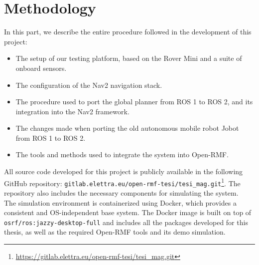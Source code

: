 \chapter{Methodology}
In this part, we describe the entire procedure followed in the development of this project:
\begin{itemize}
	\item The setup of our testing platform, based on the Rover Mini and a suite of onboard sensors.
	\item The configuration of the Nav2 navigation stack.
	\item The procedure used to port the global planner from ROS 1 to ROS 2, and its integration into the Nav2 framework.
	\item The changes made when porting the old autonomous mobile robot Jobot from ROS 1 to ROS 2.
	\item The tools and methods used to integrate the system into Open-RMF.
\end{itemize}
All source code developed for this project is publicly available in the following GitHub repository:\label{code_path} \texttt{gitlab.elettra.eu/open-rmf-tesi/tesi\_mag.git}\footnote{\href{https://gitlab.elettra.eu/open-rmf-tesi/tesi\_mag.git}{https://gitlab.elettra.eu/open-rmf-tesi/tesi\_mag.git}}. The repository also includes the necessary components for simulating the system.\\
The simulation environment is containerized using Docker, which provides a consistent and OS-independent base system. The Docker image is built on top of \texttt{osrf/ros:jazzy-desktop-full} and includes all the packages developed for this thesis, as well as the required Open-RMF tools and its demo simulation.\\



